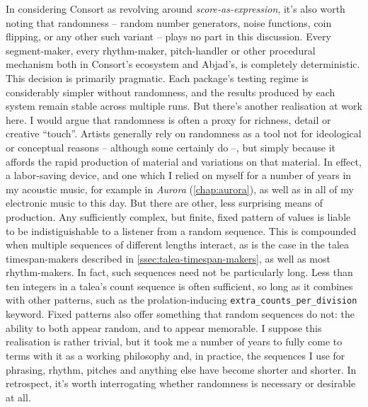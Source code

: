 \noindent In considering Consort as revolving around
\emph{score-as-expression}, it's also worth noting that randomness -- random
number generators, noise functions, coin flipping, or any other such variant --
plays no part in this discussion. Every segment-maker, every rhythm-maker,
pitch-handler or other procedural mechanism both in Consort's ecosystem and
Abjad's, is completely deterministic. This decision is primarily pragmatic.
Each package's testing regime is considerably simpler without randomness, and
the results produced by each system remain stable across multiple runs. But
there's another realisation at work here. I would argue that randomness is
often a proxy for richness, detail or creative \enquote{touch}. Artists
generally rely on randomness as a tool not for ideological or conceptual
reasons -- although some certainly do --, but simply because it affords the
rapid production of material and variations on that material. In effect, a
labor-saving device, and one which I relied on myself for a number of years in
my acoustic music, for example in \emph{Aurora} (\autoref{chap:aurora}), as
well as in all of my electronic music to this day. But there are other, less
surprising means of production. Any sufficiently complex, but finite, fixed
pattern of values is liable to be indistiguishable to a listener from a random
sequence. This is compounded when multiple sequences of different lengths
interact, as is the case in the talea timespan-makers described in
\autoref{ssec:talea-timespan-makers}, as well as most rhythm-makers. In fact,
such sequences need not be particularly long. Less than ten integers in a
talea's count sequence is often sufficient, so long as it combines with other
patterns, such as the prolation-inducing \texttt{extra\_counts\_per\_division}
keyword. Fixed patterns also offer something that random sequences do not: the
ability to both appear random, and to appear memorable. I suppose this
realisation is rather trivial, but it took me a number of years to fully come
to terms with it as a working philosophy and, in practice, the sequences I use
for phrasing, rhythm, pitches and anything else have become shorter and
shorter. In retrospect, it's worth interrogating whether randomness is
necessary or desirable at all.

